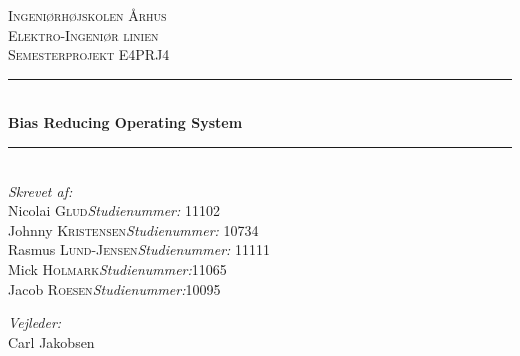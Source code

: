 \newcommand{\HRule}{\rule{\linewidth}{0.5mm}} %

\begin{center} %
 

\textsc{\LARGE Ingeniørhøjskolen Århus}\\[1.5cm] %
\textsc{\Large Elektro-Ingeniør linien}\\[0.5cm] %
\textsc{\large Semesterprojekt E4PRJ4}\\[0.5cm] %


\HRule \\[0.4cm]
{ \huge \bfseries Bias Reducing Operating System}\\[0.4cm] %
\HRule \\[1.5cm]
 

\Large \emph{Skrevet af:}\\
Nicolai \textsc{Glud}\hfill \textit{Studienummer:} 11102\\
Johnny \textsc{Kristensen}\hfill \textit{Studienummer:} 10734\\
Rasmus \textsc{Lund-Jensen}\hfill \textit{Studienummer:} 11111\\
Mick \textsc{Holmark}\hfill \textit{Studienummer:}11065\\
Jacob \textsc{Roesen}\hfill \textit{Studienummer:}10095\\
 

\vfill %

\Large \emph{Vejleder:}\hfill\phantom{m}\\
Carl Jakobsen\hfill \phantom{m}


\end{center}

